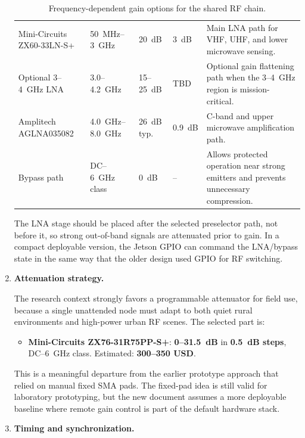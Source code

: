 \documentclass[11pt,a4paper]{article}
\newcommand{\blue}[1]{\textcolor{priceblue}{\textbf{#1}}}
\begin{document}
\begin{enumerate}[label=\roman*)]
\begin{table}[!ht]
{\begin{tabular}{p{4.2cm}p{2.3cm}p{1.7cm}p{1.5cm}p{4.6cm}}
			Mini-Circuits ZX60-33LN-S+ &
			50~MHz--3~GHz &
			20~dB &
			3~dB &
			Main LNA path for VHF, UHF, and lower microwave sensing. \\

			Optional 3--4~GHz LNA &
			3.0--4.2~GHz &
			15--25~dB &
			TBD &
			Optional gain flattening path when the 3--4~GHz region is mission-critical. \\

			Amplitech AGLNA035082 &
			4.0~GHz--8.0~GHz &
			26~dB typ. &
			0.9~dB &
			C-band and upper microwave amplification path. \\

			Bypass path &
			DC--6~GHz class &
			0~dB &
			-- &
			Allows protected operation near strong emitters and prevents unnecessary
			compression. \\

			\bottomrule
		\end{tabular}
		}
		\caption{Frequency-dependent gain options for the shared RF chain.}
		\label{tab:lna-selection}
	\end{table}

	The LNA stage should be placed after the selected preselector path, not before
	it, so strong out-of-band signals are attenuated prior to gain. In a compact
	deployable version, the Jetson GPIO can command the LNA/bypass state in the same
	way that the older design used GPIO for RF switching.

	\item \textbf{Attenuation strategy.}

	The research context strongly favors a programmable attenuator for field use,
	because a single unattended node must adapt to both quiet rural environments and
	high-power urban RF scenes. The selected part is:

	\begin{itemize}
		\item \textbf{Mini-Circuits ZX76-31R75PP-S+}: \textbf{0--31.5~dB} in
		\textbf{0.5~dB steps}, DC--6~GHz class. Estimated:
		\blue{300--350 USD}.
	\end{itemize}

	This is a meaningful departure from the earlier prototype approach that relied on
	manual fixed SMA pads. The fixed-pad idea is still valid for laboratory
	prototyping, but the new document assumes a more deployable baseline where
	remote gain control is part of the default hardware stack.

	\item \textbf{Timing and synchronization.}


\end{enumerate}
\end{document}
